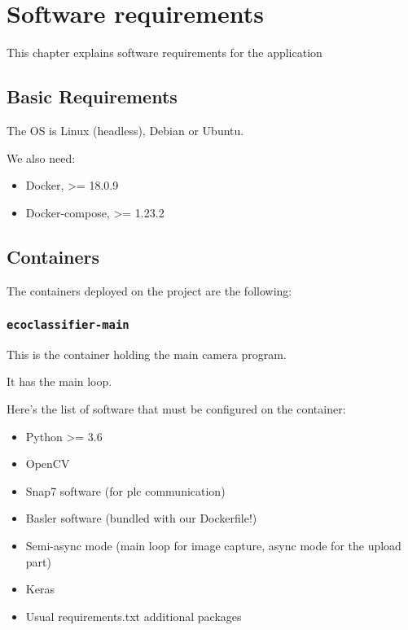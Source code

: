 \chapter{Software requirements}
\label{chapter:softwarereqs}

This chapter explains software requirements for the application

\section{Basic Requirements}

The OS is Linux (headless), Debian or Ubuntu.


We also need:

\begin{itemize}
    \item Docker, >= 18.0.9
    \item Docker-compose, >= 1.23.2
\end{itemize}

\section{Containers}

The containers deployed on the project are the following:

\subsection{\texttt{ecoclassifier-main}}

This is the container holding the main camera program.

It has the main loop.


Here's the list of software that must be configured on the container:

\begin{itemize}
    \item Python >= 3.6
    \item OpenCV
    \item Snap7 software (for \gls{plc} communication)
    \item Basler software (bundled with our Dockerfile!)
    \item Semi-async mode (main loop for image capture, async mode for the upload part)
    \item Keras
    \item Usual requirements.txt additional packages
\end{itemize}

